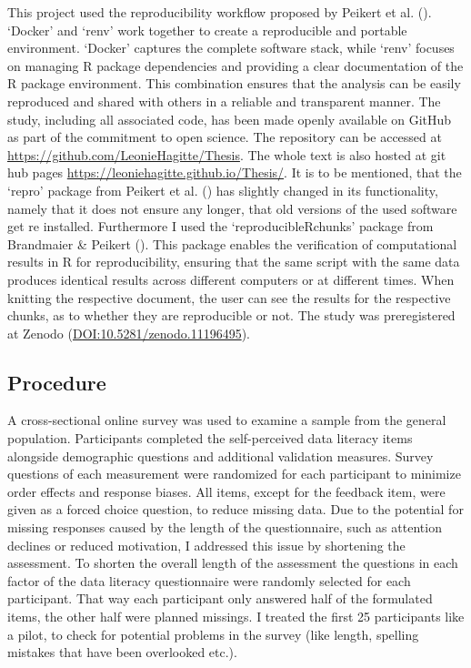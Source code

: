 \documentclass[
  12pt,
  a4paper,
  twoside]{article}
\begin{document}
This project used the reproducibility workflow proposed by Peikert et al. (). `Docker' and `renv' work together to create a reproducible and portable environment. `Docker' captures the complete software stack, while `renv' focuses on
managing R package dependencies and providing a clear documentation of the R
package environment. This combination ensures that the analysis can be easily
reproduced and shared with others in a reliable and transparent manner.
The study, including all associated code, has been made openly available on GitHub as part of the commitment to open science. The repository can be accessed at \url{https://github.com/LeonieHagitte/Thesis}.
The whole text is also hosted at git hub pages \url{https://leoniehagitte.github.io/Thesis/}.
It is to be mentioned, that the `repro' package from Peikert et al. () has slightly changed in its functionality, namely that it does not ensure any longer, that old versions of the used software get re installed. Furthermore I used the `reproducibleRchunks' package from Brandmaier \& Peikert (). This package enables the verification of computational results in R for reproducibility, ensuring that the same script with the same data produces identical results across different computers or at different times. When knitting the respective document, the user can see the results for the respective chunks, as to whether they are reproducible or not.
The study was preregistered at Zenodo (\url{DOI:10.5281/zenodo.11196495}).

\subsection{Procedure}\label{procedure}

A cross-sectional online survey was used to examine a sample from the general population. Participants completed the self-perceived data literacy items alongside demographic questions and additional validation measures. Survey questions of each measurement were randomized for each participant to minimize order effects and response biases. All items, except for the feedback item, were given as a forced choice question, to reduce missing data. Due to the potential for missing responses caused by the length of the questionnaire, such as attention declines or reduced motivation, I addressed this issue by shortening the assessment. To shorten the overall length of the assessment the questions in each factor of the data literacy questionnaire were randomly selected for each participant. That way each participant only answered half of the formulated items, the other half were planned missings. I treated the first 25 participants like a pilot, to check for potential problems in the survey (like length, spelling mistakes that have been overlooked etc.).
\end{document}

